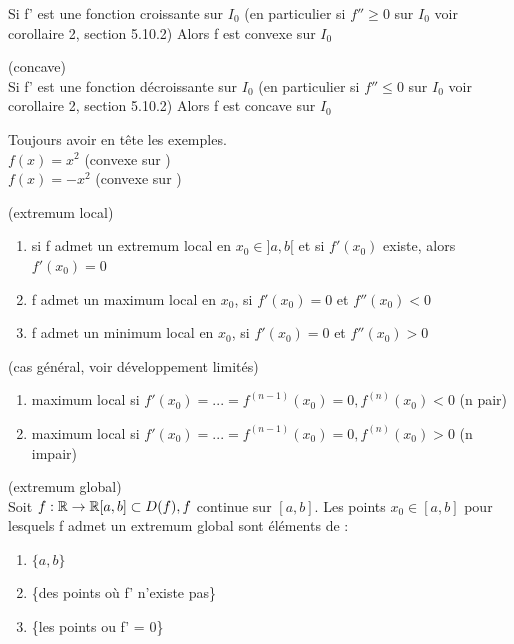 \documentclass[12pt,a4paper]{article}
\begin{document}
{\begin{boite}
	Si f' est une fonction croissante sur $I_0$ (en particulier si $f''\geq 0$ sur $I_0$ voir corollaire 2, section 5.10.2) Alors f est convexe sur $I_0$
\end{boite}
\begin{boite}
	\Theoreme (concave)\\
	Si f' est une fonction décroissante sur $I_0$ (en particulier si $f''\leq 0$ sur $I_0$ voir corollaire 2, section 5.10.2) Alors f est concave sur $I_0$
\end{boite}
 Toujours avoir en tête les exemples.\\
$f(x) = x^2$ (convexe sur \R)\\
$f(x) = -x^2$ (convexe sur \R)
\begin{boite}
	\Theoreme (extremum local)
	\begin{enumerate}
		\item si f admet un extremum local en $x_0 \in ]a,b[$ et si $f'(x_0)$ existe, alors $f'(x_0) = 0$
		\item f admet un maximum local en $x_0$, si $f'(x_0) = 0$ et $f''(x_0) < 0$
		\item f admet un minimum local en $x_0$, si $f'(x_0) = 0$ et $f''(x_0) > 0$
	\end{enumerate}
\end{boite}
\begin{boite}
 (cas général, voir développement limités)
\begin{enumerate}
	\item maximum local si $f'(x_0)=...=f^{(n-1)}(x_0) = 0, f^{(n)}(x_0) < 0$ (n pair)	
	\item maximum local si $f'(x_0)=...=f^{(n-1)}(x_0) = 0, f^{(n)}(x_0) > 0$ (n impair)
\end{enumerate}
\end{boite}
\begin{boite}
	\Theoreme (extremum global)\\
	Soit $f:\mathbb{R} \to \mathbb{R} [a,b] \subset D(f), f$ continue sur $[a,b]$. Les points $x_0 \in [a,b]$ pour lesquels f admet un extremum global sont éléments de :
	\begin{enumerate}[label=\roman*)]
		\item $\{a,b\}$%
		\item \{des points où f' n'existe pas\}
		\item \{les points ou f' = 0\}
	\end{enumerate}
\end{boite}
}
\end{document}

